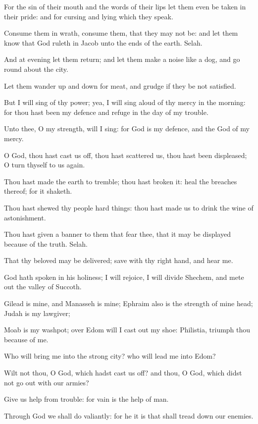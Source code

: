 \Verse For the sin of their mouth and the words of their lips let them even be taken in their pride: and for cursing and lying which they speak.

\Verse Consume them in wrath, consume them, that they may not be: and let them know that God ruleth in Jacob unto the ends of the earth.  Selah.

\Verse And at evening let them return; and let them make a noise like a dog, and go round about the city.

\Verse Let them wander up and down for meat, and grudge if they be not satisfied.

\Verse But I will sing of thy power; yea, I will sing aloud of thy mercy in the morning: for thou hast been my defence and refuge in the day of my trouble.

\Verse Unto thee, O my strength, will I sing: for God is my defence, and the God of my mercy.




\Chapter
\Verse O God, thou hast cast us off, thou hast scattered us, thou hast been displeased; O turn thyself to us again.

\Verse Thou hast made the earth to tremble; thou hast broken it: heal the breaches thereof; for it shaketh.

\Verse Thou hast shewed thy people hard things: thou hast made us to drink the wine of astonishment.

\Verse Thou hast given a banner to them that fear thee, that it may be displayed because of the truth. Selah.

\Verse That thy beloved may be delivered; save with thy right hand, and hear me.

\Verse God hath spoken in his holiness; I will rejoice, I will divide Shechem, and mete out the valley of Succoth.

\Verse Gilead is mine, and Manasseh is mine; Ephraim also is the strength of mine head; Judah is my lawgiver;

\Verse Moab is my washpot; over Edom will I cast out my shoe: Philistia, triumph thou because of me.

\Verse Who will bring me into the strong city? who will lead me into Edom?

\Verse Wilt not thou, O God, which hadst cast us off? and thou, O God, which didst not go out with our armies?

\Verse Give us help from trouble: for vain is the help of man.

\Verse Through God we shall do valiantly: for he it is that shall tread down our enemies.




